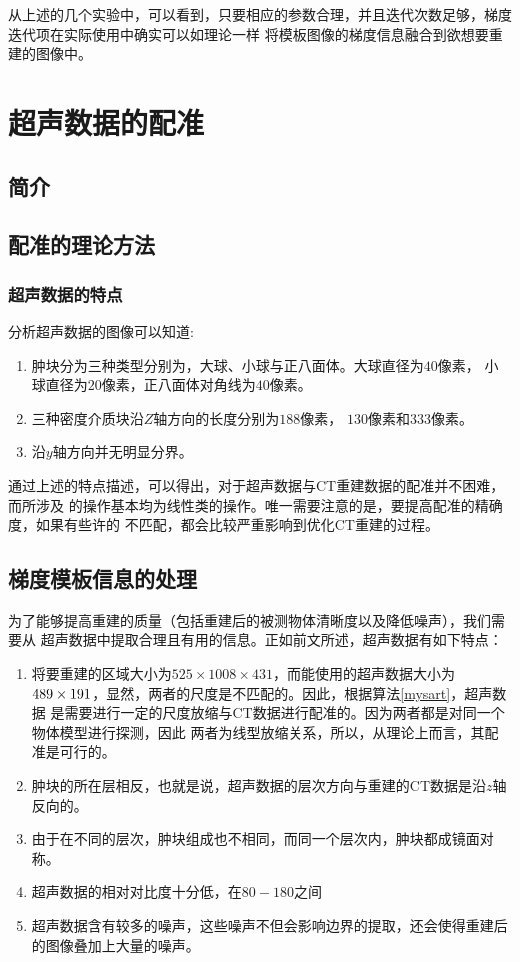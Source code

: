 从上述的几个实验中，可以看到，只要相应的参数合理，并且迭代次数足够，梯度迭代项在实际使用中确实可以如理论一样
将模板图像的梯度信息融合到欲想要重建的图像中。


\chapter{超声数据的配准}
\section{简介}



\section{配准的理论方法}
\subsection{超声数据的特点}\label{sec:usattri}
分析超声数据的图像可以知道:
\begin{enumerate}
\item 肿块分为三种类型分别为，大球、小球与正八面体。大球直径为$40$像素，
小球直径为$20$像素，正八面体对角线为$40$像素。
\item 三种密度介质块沿$Z$轴方向的长度分别为$188$像素，
$130$像素和$333$像素。
\item 沿$y$轴方向并无明显分界。
\end{enumerate}


通过上述的特点描述，可以得出，对于超声数据与CT重建数据的配准并不困难，而所涉及
的操作基本均为线性类的操作。唯一需要注意的是，要提高配准的精确度，如果有些许的
不匹配，都会比较严重影响到优化CT重建的过程。



\section{梯度模板信息的处理}
为了能够提高重建的质量（包括重建后的被测物体清晰度以及降低噪声），我们需要从
超声数据中提取合理且有用的信息。正如前文所述，超声数据有如下特点：
\begin{enumerate}
\item 将要重建的区域大小为$525\times1008\times431$，而能使用的超声数据大小为
$489\times191\time498$，显然，两者的尺度是不匹配的。因此，根据算法\ref{mysart}，超声数据
是需要进行一定的尺度放缩与CT数据进行配准的。因为两者都是对同一个物体模型进行探测，因此
两者为线型放缩关系，所以，从理论上而言，其配准是可行的。
\item 肿块的所在层相反，也就是说，超声数据的层次方向与重建的CT数据是沿$z$轴反向的。
\item 由于在不同的层次，肿块组成也不相同，而同一个层次内，肿块都成镜面对称。
\item 超声数据的相对对比度十分低，在$80-180$之间
\item 超声数据含有较多的噪声，这些噪声不但会影响边界的提取，还会使得重建后的图像叠加上大量的噪声。
\end{enumerate}

